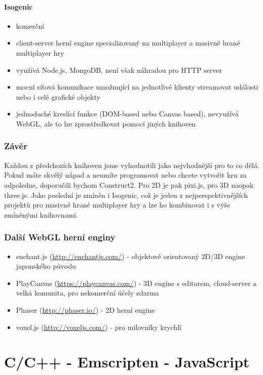 \documentclass[12pt,a4paper,titlepage,final]{report}
\begin{document}
\paragraph{Isogenic} \cite{isogenic}

\begin{itemize}
	\item komerční
	\item client-server herní engine specializovaný na multiplayer a masivně hrané multiplayer hry
	\item využívá Node.js, MongoDB, není však náhradou pro HTTP server
	\item mocní síťová komunikace umožnující na jednotlivé klienty streamovat události nebo i celé grafické objekty
	\item jednoduché kreslící funkce (DOM-based nebo Canvas based), nevyužívá WebGL, ale to lze zprostředkovat pomocí jiných knihoven
\end{itemize}

\subsubsection{Závěr}

Každou z předchozích knihoven jsme vyhodnotili jako nejvhodnější pro to co dělá. Pokud máte skvělý nápad a neumíte programovat nebo chcete vytvořit hru za odpoledne, doporučili bychom Construct2. Pro 2D je pak pixi.js, pro 3D naopak three.js. Jako poslední je zmíněn i Isogenic, což je jeden z nejperspektivnějších projektů pro masivně hrané multiplayer hry a lze ho kombinovat i s výše zmíněnými knihovnami.

\subsubsection{Další WebGL herní enginy}
\begin{itemize}
	\item enchant.js (\url{http://enchantjs.com/}) - objektově orientovaný 2D/3D engine japonského původu
	\item PlayCanvas (\url{https://playcanvas.com/}) - 3D engine s editorem, cloud-server a velká komunita, pro nekomerční účely zdarma
	\item Phaser (\url{http://phaser.io/}) - 2D herní engine
	\item voxel.js (\url{http://voxeljs.com/}) - pro milovníky krychlí
\end{itemize}

\section{C/C++ - Emscripten - JavaScript}
\end{document}
